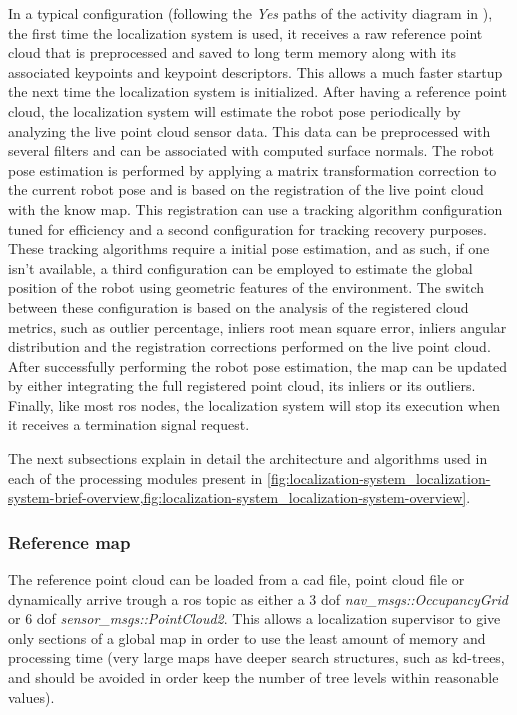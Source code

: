 In a typical configuration (following the \emph{Yes} paths of the activity diagram in ), the first time the localization system is used, it receives a raw reference point cloud that is preprocessed and saved to long term memory along with its associated keypoints and keypoint descriptors. This allows a much faster startup the next time the localization system is initialized. After having a reference point cloud, the localization system will estimate the robot pose periodically by analyzing the live point cloud sensor data. This data can be preprocessed with several filters and can be associated with computed surface normals. The robot pose estimation is performed by applying a matrix transformation correction to the current robot pose and is based on the registration of the live point cloud with the know map. This registration can use a tracking algorithm configuration tuned for efficiency and a second configuration for tracking recovery purposes. These tracking algorithms require a initial pose estimation, and as such, if one isn't available, a third configuration can be employed to estimate the global position of the robot using geometric features of the environment. The switch between these configuration is based on the analysis of the registered cloud metrics, such as outlier percentage, inliers root mean square error, inliers angular distribution and the registration corrections performed on the live point cloud. After successfully performing the robot pose estimation, the map can be updated by either integrating the full registered point cloud, its inliers or its outliers. Finally, like most \gls{ros} nodes, the localization system will stop its execution when it receives a termination signal request.

The next subsections explain in detail the architecture and algorithms used in each of the processing modules present in \cref{fig:localization-system_localization-system-brief-overview,fig:localization-system_localization-system-overview}.


\subsubsection{Reference map}

The reference point cloud can be loaded from a \gls{cad} file, point cloud file or dynamically arrive trough a \gls{ros} topic as either a 3 \gls{dof} \emph{nav\_msgs::OccupancyGrid} or 6 \gls{dof} \emph{sensor\_msgs::PointCloud2}. This allows a localization supervisor to give only sections of a global map in order to use the least amount of memory and processing time (very large maps have deeper search structures, such as kd-trees, and should be avoided in order keep the number of tree levels within reasonable values).


